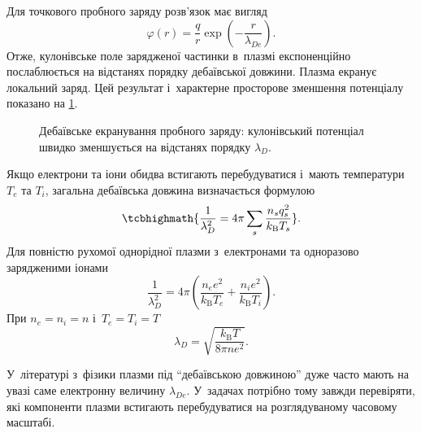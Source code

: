 Для точкового пробного заряду розв'язок має вигляд
\begin{equation}
	\varphi(r)
	=\frac{q}{r}
	\exp\left(-\frac{r}{\lambda_{De}}\right).
\end{equation}
Отже, кулонівське поле зарядженої частинки в~плазмі експоненційно послаблюється на відстанях порядку дебаївської довжини. Плазма екранує локальний заряд. Цей результат і~характерне просторове зменшення потенціалу показано на \ref{fig:debye-screening}.

\begin{figure}[htbp]\centering
	\caption{Дебаївське екранування пробного заряду: кулонівський потенціал швидко зменшується на відстанях порядку $\lambda_D$.}\label{fig:debye-screening}
\end{figure}

Якщо електрони та іони обидва встигають перебудуватися і~мають температури $T_e$ та $T_i$, загальна дебаївська довжина визначається формулою
\begin{equation}
	\tcbhighmath{
		\frac{1}{\lambda_D^2}
		=4\pi\sum_s\frac{n_s q_s^2}{k_{\mathrm B}T_s}
	}.
\end{equation}
Для повністю рухомої однорідної плазми з~електронами та одноразово зарядженими іонами
\begin{equation}
	\frac{1}{\lambda_D^2}
	=4\pi\left(
	\frac{n_e e^2}{k_{\mathrm B}T_e}
	+\frac{n_i e^2}{k_{\mathrm B}T_i}\right).
\end{equation}
При $n_e=n_i=n$ і~$T_e=T_i=T$
\begin{equation}
	\lambda_D
	=\sqrt{\frac{k_{\mathrm B}T}{8\pi ne^2}}.
\end{equation}

У~літературі з~фізики плазми під \enquote{дебаївською довжиною} дуже часто мають на увазі саме електронну величину $\lambda_{De}$. У~задачах потрібно тому завжди перевіряти, які компоненти плазми встигають перебудуватися на розглядуваному часовому масштабі.



